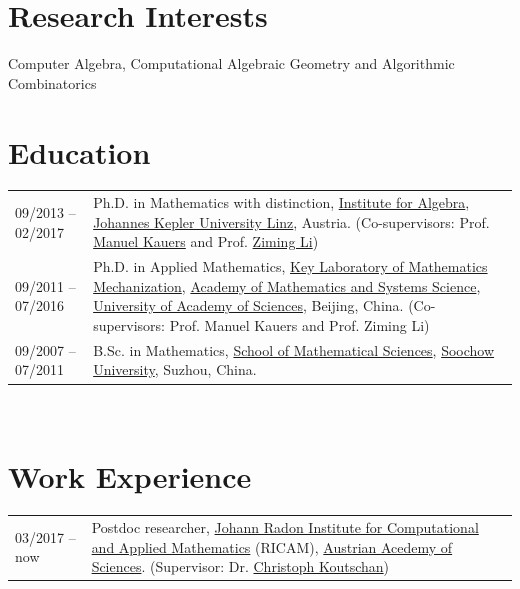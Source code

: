 \documentclass[a4paper,12pt]{article}
\begin{document}
\section*{\Large{Research Interests}}
Computer Algebra, Computational Algebraic Geometry and Algorithmic Combinatorics

\section*{\Large{Education}}
\begin{tabular}{@{}p{1.4in}p{4in}}
09/2013 -- 02/2017    & Ph.D. in Mathematics with distinction, 
                        \href{http://www.jku.at/algebra/content}{Institute for Algebra}, 
                        \href{http://www.jku.at/content}{Johannes Kepler University Linz}, Austria. 
                        (Co-supervisors: Prof. \href{http://www.kauers.de/}{Manuel Kauers} and 
                        Prof. \href{http://mmrc.iss.ac.cn/~zmli/}{Ziming Li})\\
09/2011 -- 07/2016    & Ph.D. in Applied Mathematics, 
                        \href{http://english.mmrc.amss.cas.cn/}{Key Laboratory of Mathematics Mechanization}, 
                        \href{http://english.amss.cas.cn/}{Academy of Mathematics and Systems Science}, 
                        \href{http://english.ucas.ac.cn/}{University of Academy of Sciences}, Beijing, China. 
                        (Co-supervisors: Prof. Manuel Kauers and Prof. Ziming Li)\\
09/2007 -- 07/2011    & B.Sc. in Mathematics, \href{http://math.suda.edu.cn/}{School of Mathematical Sciences}, 
                        \href{http://eng.suda.edu.cn/}{Soochow University}, Suzhou, China.  
\end{tabular} \\



\section*{\Large{Work Experience}}
\begin{tabular}{@{}p{1.4in}p{4in}}
03/2017 -- now    & Postdoc researcher, 
                        \href{https://www.ricam.oeaw.ac.at/}{Johann Radon Institute for Computational and Applied Mathematics} (RICAM),
                        \href{http://www.oeaw.ac.at/en/austrian-academy-of-sciences/}{Austrian Acedemy of Sciences}. 
                        (Supervisor: Dr. \href{http://www.koutschan.de/}{Christoph Koutschan})\\
\end{tabular}
\end{document}
